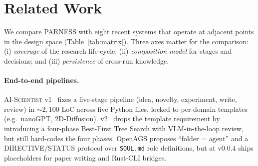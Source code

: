 \documentclass{article}
\newcommand{\parness}{\textsf{PARNESS}}
\newcommand{\code}[1]{\texttt{\small #1}}
\begin{document}
\section{Related Work}
\label{sec:related}

We compare \parness{} with eight recent systems that operate at adjacent
points in the design space (Table~\ref{tab:matrix}). Three axes matter for
the comparison: (i) \emph{coverage} of the research life-cycle;
(ii) \emph{composition model} for stages and decisions; and
(iii) \emph{persistence} of cross-run knowledge.

\paragraph{End-to-end pipelines.}
\textsc{AI-Scientist} v1~\cite{aisciv1} fixes a five-stage pipeline (idea,
novelty, experiment, write, review) in $\sim\!2{,}100$ LoC across five
Python files, locked to per-domain templates (e.g.\ nanoGPT, 2D-Diffusion).
v2~\cite{aisciv2} drops the template requirement by introducing a
four-phase Best-First Tree Search with VLM-in-the-loop review, but still
hard-codes the four phases. OpenAGS proposes ``folder = agent'' and a
DIRECTIVE/STATUS protocol over \code{SOUL.md} role definitions, but at
v$0.0.4$ ships placeholders for paper writing and Rust-CLI bridges.
\end{document}
